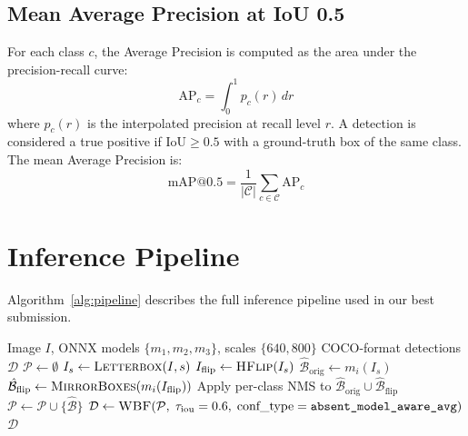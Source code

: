 \documentclass[11pt,a4paper]{article}
\begin{document}
\subsection{Mean Average Precision at IoU 0.5}

For each class $c$, the Average Precision is computed as the area under the precision-recall curve:
\begin{equation}
    \text{AP}_c = \int_0^1 p_c(r)\, dr
    \label{eq:ap}
\end{equation}
where $p_c(r)$ is the interpolated precision at recall level $r$.
A detection is considered a true positive if $\text{IoU} \geq 0.5$ with a ground-truth box of the same class.
The mean Average Precision is:
\begin{equation}
    \text{mAP}@0.5 = \frac{1}{|\mathcal{C}|} \sum_{c \in \mathcal{C}} \text{AP}_c
    \label{eq:map}
\end{equation}

\section{Inference Pipeline}
\label{sec:pipeline}

Algorithm~\ref{alg:pipeline} describes the full inference pipeline used in our best submission.

\begin{algorithm}[H]
\caption{Multi-Scale Ensemble Inference Pipeline}
\label{alg:pipeline}
\begin{algorithmic}[1]
\Require Image $I$, ONNX models $\{m_1, m_2, m_3\}$, scales $\{640, 800\}$
\Ensure COCO-format detections $\mathcal{D}$
\State $\mathcal{P} \gets \emptyset$ 
        \State $I_s \gets \textsc{Letterbox}(I, s)$ 
        \State $I_{\text{flip}} \gets \textsc{HFlip}(I_s)$ 
        \State $\hat{\mathcal{B}}_{\text{orig}} \gets m_i(I_s)$ 
        \State $\hat{\mathcal{B}}_{\text{flip}} \gets \textsc{MirrorBoxes}(m_i(I_{\text{flip}}))$ 
        \State Apply per-class NMS to $\hat{\mathcal{B}}_{\text{orig}} \cup \hat{\mathcal{B}}_{\text{flip}}$
        \State $\mathcal{P} \gets \mathcal{P} \cup \{\hat{\mathcal{B}}\}$
    \EndFor
\EndFor
\State $\mathcal{D} \gets \textsc{WBF}(\mathcal{P},\; \tau_{\text{iou}}=0.6,\; \text{conf\_type}=\texttt{absent\_model\_aware\_avg})$
\State \Return $\mathcal{D}$
\end{algorithmic}
\end{algorithm}
\end{document}
